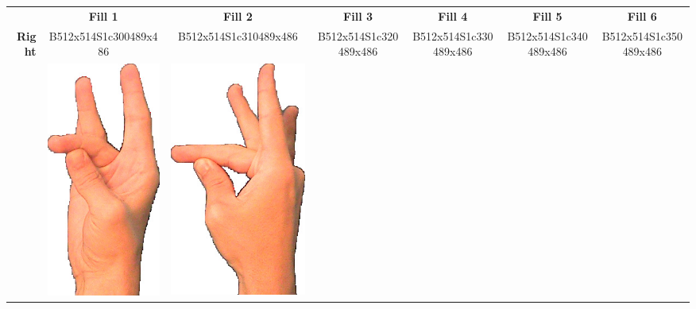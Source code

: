 \documentclass{article}
\begin{document}
\begin{center}
\begin{tabular}{r*{6}{c}}
&\textbf{Fill 1}&\textbf{Fill 2}&\textbf{Fill 3}&\textbf{Fill 4}&\textbf{Fill 5}&\textbf{Fill 6}\\
\multirow{2}{*}{\textbf{Right}}&
B512x514S1c300489x486&
B512x514S1c310489x486&
B512x514S1c320489x486&
B512x514S1c330489x486&
B512x514S1c340489x486&
B512x514S1c350489x486\\
&
\includegraphics[scale=0.1]{images/08-02-1.jpg}&
\includegraphics[scale=0.1]{images/08-02-2.jpg}&

\end{tabular}
\end{center}
\end{document}
